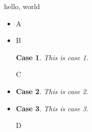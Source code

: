 \documentclass{amsart}
\newtheorem{case}{Case}
\begin{document}
hello, world

\begin{itemize}

\item A

\item B

\begin{case}
This is case 1.
\end{case}

C

\item \begin{case}This is case 2.\end{case}

\item \begin{case}This is case 3.\end{case}

D

\end{itemize}
\end{document}
